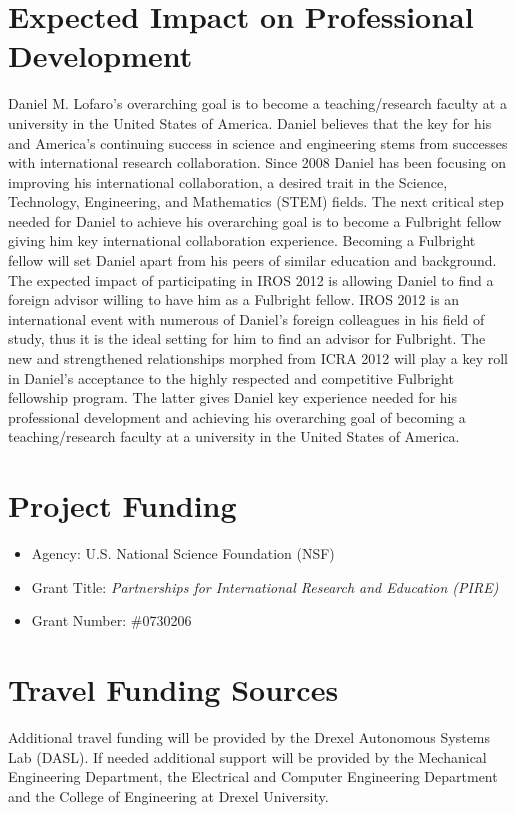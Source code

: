 \documentclass[11pt,a4paper,oneside]{report}
\begin{document}
\section*{Expected Impact on Professional Development}
Daniel M. Lofaro's overarching goal is to become a teaching/research faculty at a university in the United States of America.  
Daniel believes that the key for his and America's continuing success in science and engineering stems from successes with international research collaboration.
Since 2008 Daniel has been focusing on improving his international collaboration, a desired trait in the Science, Technology, Engineering, and Mathematics (STEM) fields.
The next critical step needed for Daniel to achieve his overarching goal is to become a Fulbright fellow giving him key international collaboration experience.  
Becoming a Fulbright fellow will set Daniel apart from his peers of similar education and background.
The expected impact of participating in IROS 2012 is allowing Daniel to find a foreign advisor willing to have him as a Fulbright fellow.
IROS 2012 is an international event with numerous of Daniel's foreign colleagues in his field of study, thus it is the ideal setting for him to find an advisor for Fulbright.
The new and strengthened relationships morphed from ICRA 2012 will play a key roll in Daniel's acceptance to the highly respected and competitive Fulbright fellowship program.
The latter gives Daniel key experience needed for his professional development and achieving his overarching goal of becoming a teaching/research faculty at a university in the United States of America.


\section*{Project Funding}
\begin{itemize}
\item Agency: U.S. National Science Foundation (NSF)
\item Grant Title: \textit{Partnerships for International Research
and Education (PIRE)}
\item Grant Number: \#0730206
\end{itemize}

\section*{Travel Funding Sources}
Additional travel funding will be provided by the Drexel Autonomous Systems Lab (DASL).  If needed additional support will be provided by the Mechanical Engineering Department, the Electrical and Computer Engineering Department and the College of Engineering at Drexel University.
\end{document}
